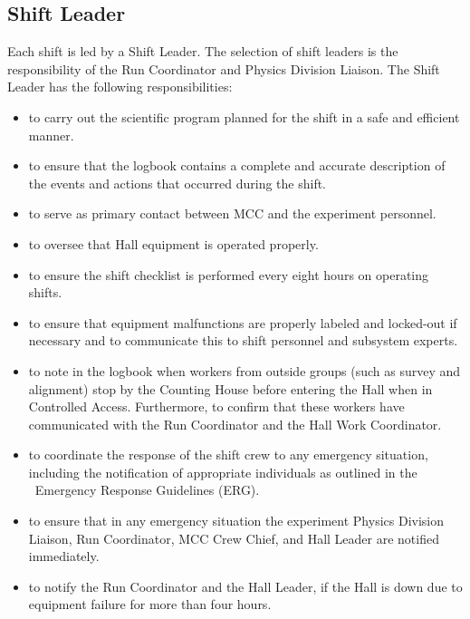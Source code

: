 \documentclass[11pt]{article}
\begin{document}
\subsection{Shift Leader}
\indent

Each shift is led by a Shift Leader. The selection of shift leaders
is the responsibility of the Run Coordinator and Physics Division Liaison.
The  Shift Leader has the following responsibilities: 

\begin{itemize}

\item to carry out the scientific program planned for the shift in a safe
and efficient manner.

\item to ensure that the logbook contains a complete and accurate
description of the events and actions that occurred during the shift.

\item to serve as primary contact between MCC and the
experiment personnel.

\item  to oversee that Hall equipment is operated properly.

\item to ensure the shift checklist is performed every eight hours on operating
shifts.

\item to ensure that equipment malfunctions are properly labeled and
locked-out if necessary and to communicate this to shift personnel and 
subsystem experts.

 \item to note in the logbook when workers from outside groups (such as survey 
and alignment) stop by the Counting House before entering the Hall when in 
Controlled Access. Furthermore, to confirm that these workers have
communicated with the Run Coordinator and the Hall Work Coordinator.

\item to coordinate the response of the shift crew to any
emergency situation, including the notification of appropriate individuals as
outlined in the \HALL\ Emergency Response Guidelines (ERG).

\item  to ensure that in any emergency situation the 
experiment Physics Division Liaison, Run Coordinator, MCC Crew Chief, and Hall Leader 
are notified immediately.

\item to notify the Run Coordinator and the Hall Leader, if the Hall is down due to equipment failure for more than four hours.


\end{itemize}
\end{document}
